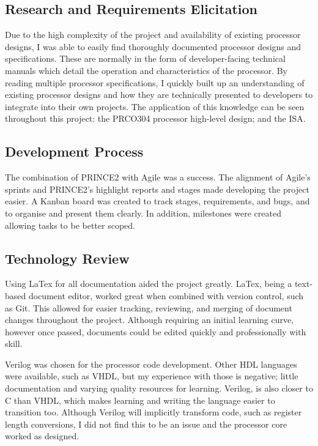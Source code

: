 \documentclass[11pt,a4paper]{report}
\newcommand{\scname}{PRCO304}
\begin{document}
\subsection*{Research and Requirements Elicitation}
Due to the high complexity of the project and availability of existing processor designs, I was able to easily find thoroughly documented processor designs and specifications. These are normally in the form of developer-facing technical manuals which detail the operation and characteristics of the processor. By reading multiple processor specifications, I quickly built up an understanding of existing processor designs and how they are technically presented to developers to integrate into their own projects. The application of this knowledge can be seen throughout this project: the \scname{} processor high-level design; and the ISA.

\subsection*{Development Process}
The combination of PRINCE2 with Agile was a success. The alignment of Agile's sprints and PRINCE2's highlight reports and stages made developing the project easier. A Kanban board was created to track stages, requirements, and bugs, and to  organise and present them clearly. In addition, milestones were created allowing tasks to be better scoped.

\subsection*{Technology Review}
Using LaTex for all documentation aided the project greatly. LaTex, being a text-based document editor, worked great when combined with version control, such as Git. This allowed for easier tracking, reviewing, and merging of document changes throughout the project. Although requiring an initial learning curve, however once passed, documents could be edited quickly and professionally with skill.

Verilog was chosen for the processor code development. Other HDL languages were available, such as VHDL, but my experience with those is negative; little documentation and varying quality resources for learning. Verilog, is also closer to C than VHDL, which makes learning and writing the language easier to transition too. Although Verilog will implicitly transform code, such as register length conversions, I did not find this to be an issue and the processor core worked as designed.
\end{document}
